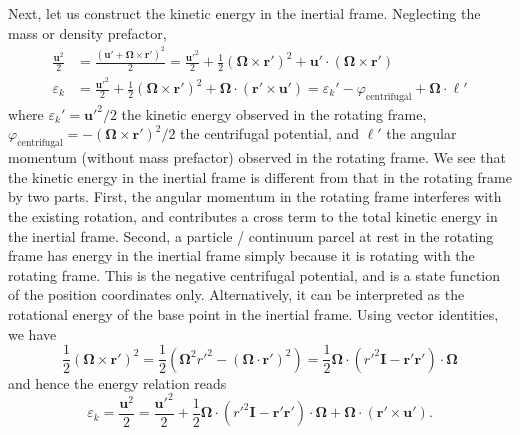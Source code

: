 Next, let us construct the kinetic energy in the inertial frame. Neglecting the mass or density prefactor, 
%
\begin{equation}
\begin{aligned}
    \frac{\mathbf{u}^2}{2} &= \frac{(\mathbf{u}' + \boldsymbol{\Omega}\times \mathbf{r}')^2}{2} = \frac{\mathbf{u}'^2}{2} + \frac{1}{2}(\boldsymbol{\Omega}\times \mathbf{r}')^2 + \mathbf{u'}\cdot (\boldsymbol{\Omega}\times \mathbf{r}') \\ 
    \varepsilon_k &= \frac{\mathbf{u}'^2}{2} + \frac{1}{2}(\boldsymbol{\Omega}\times \mathbf{r}')^2 + \boldsymbol{\Omega} \cdot (\mathbf{r}'\times \mathbf{u'}) = \varepsilon_k' - \varphi_\mathrm{centrifugal} + \boldsymbol{\Omega}\cdot \boldsymbol{\ell}'
\end{aligned}
\end{equation}
%
where $\varepsilon_k' = \mathbf{u}'^2/2$ the kinetic energy observed in the rotating frame, $\varphi_\mathrm{centrifugal} = - (\boldsymbol{\Omega}\times \mathbf{r}')^2/2$ the centrifugal potential, and $\boldsymbol{\ell}'$ the angular momentum (without mass prefactor) observed in the rotating frame. We see that the kinetic energy in the inertial frame is different from that in the rotating frame by two parts. 
First, the angular momentum in the rotating frame interferes with the existing rotation, and contributes a cross term to the total kinetic energy in the inertial frame.
Second, a particle / continuum parcel at rest in the rotating frame has energy in the inertial frame simply because it is rotating with the rotating frame. This is the negative centrifugal potential, and is a state function of the position coordinates only. 
Alternatively, it can be interpreted as the rotational energy of the base point in the inertial frame. Using vector identities, we have
%
\[
    \frac{1}{2}(\boldsymbol{\Omega}\times \mathbf{r}')^2 = \frac{1}{2} \left(\boldsymbol{\Omega}^2 r'^2 - (\boldsymbol{\Omega}\cdot \mathbf{r}')^2\right) = \frac{1}{2} \boldsymbol{\Omega} \cdot \left(r'^2 \mathbf{I} - \mathbf{r}'\mathbf{r}'\right) \cdot \boldsymbol{\Omega}
\]
%
and hence the energy relation reads
%
\begin{equation}\label{eqn:energy-rotating-frame}
    \varepsilon_k = \frac{\mathbf{u}^2}{2} = \frac{\mathbf{u}'^2}{2} + \frac{1}{2} \boldsymbol{\Omega} \cdot \left(r'^2 \mathbf{I} - \mathbf{r}'\mathbf{r}'\right) \cdot \boldsymbol{\Omega} + \boldsymbol{\Omega} \cdot (\mathbf{r}'\times \mathbf{u'}).
\end{equation}
%


